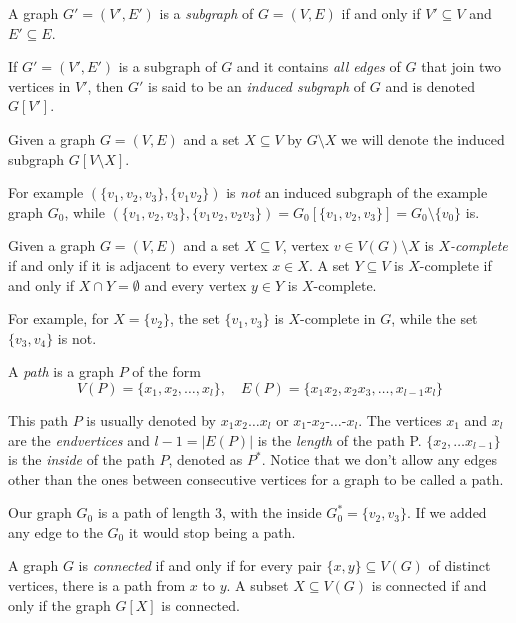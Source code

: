 \begin{defn}[subgraph]
  A graph $G' = (V', E')$ is a \emph{subgraph} of $G = (V, E)$ if and only if $V' \subseteq V$ and $E' \subseteq E$.
\end{defn}

\begin{defn}
  If $G' = (V', E')$ is a subgraph of $G$ and it contains \emph{all edges} of $G$ that join two vertices in $V'$, then $G'$ is said to be an \emph{induced subgraph} of $G$ and is denoted $G[V']$.
\end{defn}

Given a graph $G = (V, E)$ and a set $X \subseteq V$ by $G\setminus X$ we will denote the induced subgraph $G[V\setminus X]$.

For example $(\{v_1, v_2, v_3\}, \{v_1v_2\})$ is \emph{not} an induced subgraph of the example graph $G_0$, while $(\{v_1, v_2, v_3\}, \{v_1v_2, v_2v_3\}) = G_0[\{v_1, v_2, v_3\}] = G_0 \setminus \{v_0\}$ is.

\begin{defn}[$X$-completeness]
  Given a graph $G = (V, E)$ and a set $X \subseteq V$, vertex $v \in V(G) \setminus X$ is \emph{$X$-complete} if and only if it is adjacent to every vertex $x \in X$. A set $Y \subseteq V$ is $X$-complete if and only if $X \cap Y = \emptyset$ and every vertex $y \in Y$ is $X$-complete.
\end{defn}

For example, for $X = \{v_2\}$, the set $\{v_1, v_3\}$ is $X$-complete in $G$, while the set $\{v_3, v_4\}$ is not.

\begin{defn}[path]
  A \emph{path} is a graph $P$ of the form
  \[ V(P) = \{x_1, x_2, \ldots, x_l\},\quad E(P) = \{x_1x_2, x_2x_3, \ldots, x_{l-1}x_l\} \]
\end{defn}
This path $P$ is usually denoted by $x_1x_2\ldots x_l$ or $x_1$-$x_2$-$\ldots$-$x_l$. The vertices $x_1$ and $x_l$ are the \emph{endvertices} and ${l-1} = |E(P)|$ is the \emph{length} of the path P. $\{x_2, \ldots x_{l-1}\}$ is the \emph{inside} of the path $P$, denoted as $P^*$. Notice that we don't allow any edges other than the ones between consecutive vertices for a graph to be called a path.

Our graph $G_0$ is a path of length 3, with the inside $G_0^* = \{v_2, v_3\}$. If we added any edge to the $G_0$ it would stop being a path.


\begin{defn}
  A graph $G$ is \emph{connected} if and only if for every pair $\{x, y\} \subseteq V(G)$ of distinct vertices, there is a path from $x$ to $y$.
  A subset $X \subseteq V(G)$ is connected if and only if the graph $G[X]$ is connected.
\end{defn}

